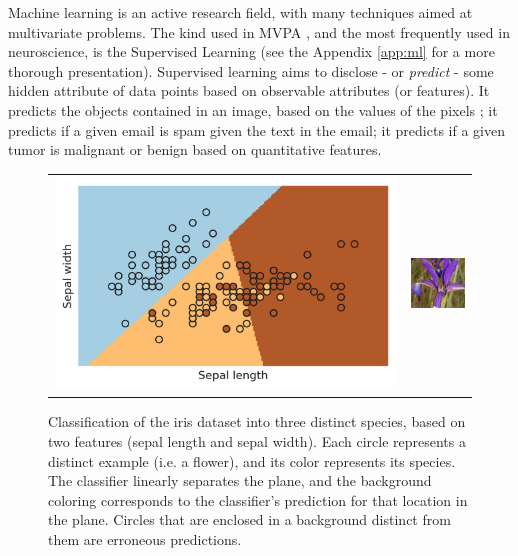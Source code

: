         Machine learning is an active research field, with many techniques aimed at multivariate problems. The kind used in MVPA \cite{merchant2008we}, and the most frequently used in neuroscience, is the Supervised Learning (see the Appendix \ref{app:ml} for a more thorough presentation). Supervised learning aims to disclose - or \textit{predict} - some hidden attribute of data points based on observable attributes  (or features). It predicts the objects contained in an image, based on the values of the pixels \cite{}; it predicts if a given email is spam given the text in the email; it predicts if a given tumor is malignant or benign based on quantitative features.
        
        \begin{figure}
            \centering
            \begin{tabular}{cc}
            \includegraphics[height=0.33\textwidth]{figures/iris_classification.png} &  
            \includegraphics[height=0.3\textwidth]{figures/sketches/Large53.jpg}
            \\
            \end{tabular}
            
            \caption[Classification of the iris dataset]{Classification of the iris dataset into three distinct species, based on two features (sepal length and sepal width). Each circle represents a distinct example (i.e. a flower), and its color represents its species. The classifier linearly separates the plane, and the background coloring corresponds to the classifier's prediction for that location in the plane. Circles that are enclosed in a background distinct from them are erroneous predictions.}
            \label{fig:iris_prediction}
        \end{figure}
        
